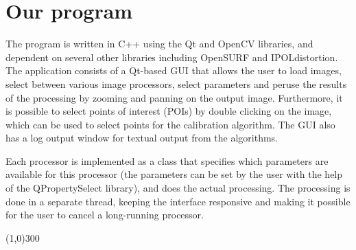 \section{Our program}
\label{sec:prog}
The program is written in C++ using the Qt and OpenCV libraries, and
dependent on several other libraries including OpenSURF and IPOLdistortion.
The application consists of a Qt-based GUI that allows the user to load
images, select between various image processors, select parameters and
peruse the results of the processing by zooming and panning on the
output image. Furthermore, it is possible to select points of interest
(POIs) by double clicking on the image, which can be used to select
points for the calibration algorithm. The GUI also has a log output
window for textual output from the algorithms.

Each processor is implemented as a class that specifies which
parameters are available for this processor (the parameters can be set
by the user with the help of the QPropertySelect library), and does
the actual processing. The processing is done in a separate thread, keeping the interface responsive and making it possible for the user to
cancel a long-running processor.






\begin{center}
\line(1,0){300}
\end{center}